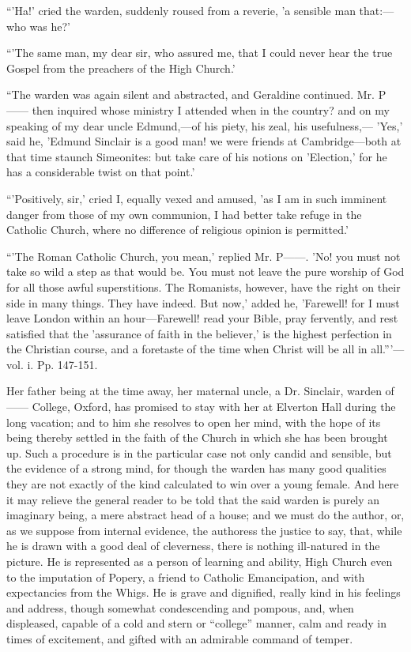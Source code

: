 ``'Ha!' cried the warden, suddenly
roused from a reverie, 'a sensible man that:—who was he?'

``'The same man, my dear sir, who
assured me, that I could never hear the true Gospel from the preachers
of the High Church.'

``The warden was again silent and
abstracted, and Geraldine continued. Mr. P—— then inquired whose
ministry I attended when in the country? and on my speaking of my dear
uncle Edmund,—of his piety, his zeal, his
usefulness,— 'Yes,' said he, 'Edmund Sinclair is a good man! we were
friends at Cambridge—both at that time staunch Simeonites: but take
care of his notions on 'Election,' for he has a considerable twist on
that point.'

``'Positively, sir,' cried I, equally
vexed and amused, 'as I am in such imminent danger from those of my own
communion, I had better take refuge in the Catholic Church, where no
difference of religious opinion is permitted.'

``'The Roman Catholic Church, you
mean,' replied Mr. P——. 'No! you must not take so wild a step as
that would be. You must not leave the pure worship of God for all those
awful superstitions. The Romanists, however, have the right on their
side in many things. They have indeed. But now,' added he, 'Farewell!
for I must leave London within an hour—Farewell! read your Bible, pray
fervently, and rest satisfied that the 'assurance of faith in the
believer,' is the highest perfection in the Christian course, and a
foretaste of the time when Christ will be all in all.'''—vol. i. Pp.
147-151.

Her father being at the time away, her maternal
uncle, a Dr. Sinclair, warden of —— College, Oxford, has promised to
stay with her at Elverton Hall during the long vacation; and to him she
resolves to open her mind, with the hope of its being thereby settled in
the faith of the Church in which she has been brought up. Such a
procedure is in the particular case not only candid and sensible, but
the evidence of a strong mind, for though the warden has many good
qualities they are not exactly of the kind calculated to win over a
young female. And here it may relieve the general reader to be told that
the said warden is purely an imaginary being, a mere abstract head of a
house; and we must do the author, or, as we suppose from internal
evidence, the authoress the justice to say, that, while he is drawn with
a good deal of cleverness, there is nothing ill-natured in the picture.
He is represented as a person of learning and ability, High Church even
to the imputation of Popery, a friend to Catholic Emancipation, and with
expectancies from the Whigs. He is grave and dignified, really kind in
his feelings and address, though somewhat condescending and pompous,
and, when displeased, capable of a cold and stern or ``college'' manner,
calm and ready in times of excitement, and gifted with an admirable
command of temper.

